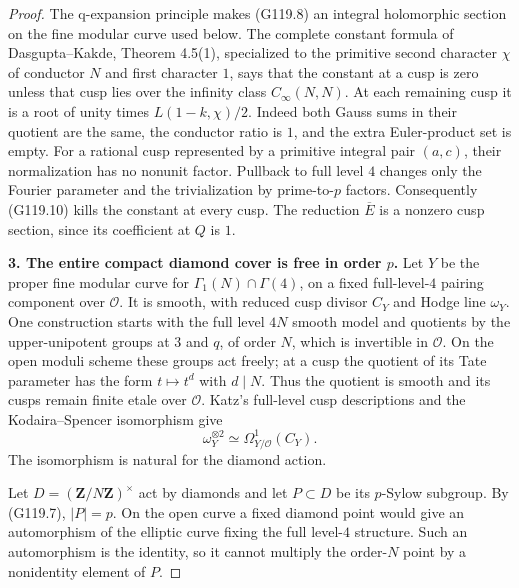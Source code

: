 \begin{proof}
The q-expansion principle makes (G119.8) an integral holomorphic
section on the fine modular curve used below.
The complete constant formula of Dasgupta--Kakde, Theorem 4.5(1),
specialized to the primitive second character $\chi$ of conductor
$N$ and first character $1$, says that the constant at a cusp is
zero unless that cusp lies over the infinity class $C_\infty(N,N)$.
At each remaining cusp it is a root of unity times
$L(1-k,\chi)/2$.
Indeed both Gauss sums in their quotient are the same, the
conductor ratio is $1$, and the extra Euler-product set is empty.
For a rational cusp represented by a primitive integral pair
$(a,c)$, their normalization has no nonunit factor.
Pullback to full level $4$ changes only the Fourier parameter and
the trivialization by prime-to-$p$ factors.
Consequently (G119.10) kills the constant at every cusp.
The reduction $\overline E$ is a nonzero cusp section, since its
coefficient at $Q$ is $1$.

\textbf{3. The entire compact diamond cover is free in order $p$.}
Let $Y$ be the proper fine modular curve for
$\Gamma_1(N)\cap\Gamma(4)$, on a fixed full-level-$4$ pairing
component over $\mathcal O$.
It is smooth, with reduced cusp divisor $C_Y$ and Hodge line
$\omega_Y$.  One construction starts with the full level $4N$
smooth model and quotients by the upper-unipotent groups at $3$
and $q$, of order $N$, which is invertible in $\mathcal O$.
On the open moduli scheme these groups act freely; at a cusp the
quotient of its Tate parameter has the form $t\mapsto t^d$ with
$d\mid N$.  Thus the quotient is smooth and its cusps remain
finite etale over $\mathcal O$.
Katz's full-level cusp descriptions and the Kodaira--Spencer
isomorphism give
\[
 \omega_Y^{\otimes2}\simeq\Omega^1_{Y/\mathcal O}(C_Y).
 \tag{G119.11}
\]
The isomorphism is natural for the diamond action.

Let $D=(\mathbf Z/N\mathbf Z)^\times$ act by diamonds and let
$P\subset D$ be its $p$-Sylow subgroup.  By (G119.7), $|P|=p$.
On the open curve a fixed diamond point would give an automorphism
of the elliptic curve fixing the full level-$4$ structure.
Such an automorphism is the identity, so it cannot multiply the
order-$N$ point by a nonidentity element of $P$.


\end{proof}
